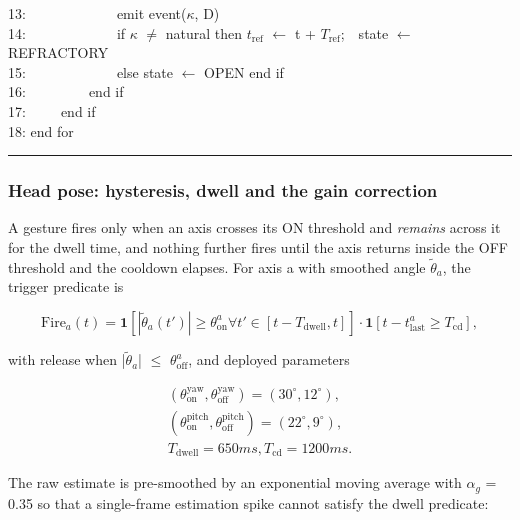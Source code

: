 \begin{algorithm}[htbp]
{13:~~~~~~~~~~~~~emit event($\kappa$, D) \\
14:~~~~~~~~~~~~~if $\kappa$ $\neq$ natural then $t_{\mathrm{ref}}$ $\leftarrow$ t + $T_{\mathrm{ref}}$;~~state $\leftarrow$ REFRACTORY \\
15:~~~~~~~~~~~~~else state $\leftarrow$ OPEN end if \\
16:~~~~~~~~~end if \\
17:~~~~~end if \\
18: end for
\par}
\vspace{3pt}\hrule
\end{algorithm}

\subsubsection{Head pose: hysteresis, dwell and the gain correction}

A gesture fires only when an axis crosses its ON threshold and \emph{remains} across it for the dwell time, and nothing further fires until the axis returns inside the OFF threshold and the cooldown elapses. For axis a with smoothed angle $\tilde{\theta }_{a}$, the trigger predicate is

\begin{equation}
\label{eq:124}
\mathrm{Fire}_a(t) = \mathbf{1}[ |\tilde{\theta }_a(t')| \geq \theta _{\mathrm{on}}^a \forall t' \in [t - T_{\mathrm{dwell}}, t] ] \cdot \mathbf{1}[ t - t_{\mathrm{last}}^a \geq T_{\mathrm{cd}} ] ,
\end{equation}

with release when |$\tilde{\theta }_{a}$| $\leq$ $\theta_{\mathrm{off}}^{a}$, and deployed parameters

\begin{equation}
\label{eq:125}
\begin{aligned}
(\theta _{\mathrm{on}}^{\mathrm{yaw}}, \theta _{\mathrm{off}}^{\mathrm{yaw}}) = (30^{\circ}, 12^{\circ}), \\
(\theta _{\mathrm{on}}^{\mathrm{pitch}}, \theta _{\mathrm{off}}^{\mathrm{pitch}}) = (22^{\circ}, 9^{\circ}), \\
T_{\mathrm{dwell}} = 650 ms, T_{\mathrm{cd}} = 1200 ms.
\end{aligned}
\end{equation}

The raw estimate is pre-smoothed by an exponential moving average with $\alpha_{g}$ = 0.35 so that a single-frame estimation spike cannot satisfy the dwell predicate:

